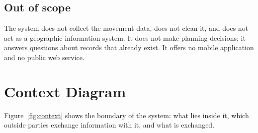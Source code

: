 \documentclass[12pt,a4paper]{report}
\begin{document}
\subsection{Out of scope}
The system does not collect the movement data, does not clean it, and does
not act as a geographic information system. It does not make planning
decisions; it answers questions about records that already exist. It
offers no mobile application and no public web service.

\section{Context Diagram}
\label{sec:context}

Figure~\ref{fig:context} shows the boundary of the system: what lies inside
it, which outside parties exchange information with it, and what is
exchanged.
\end{document}
